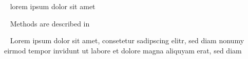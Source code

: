 



\vspace{-\baselineskip} %

\setcounter{figure}{0}
\setcounter{table}{0}






\ %
lorem ipsum dolor sit amet


\ %
Methods are described in 



\ %
Lorem ipsum dolor sit amet, consetetur sadipscing elitr, sed diam nonumy
eirmod tempor invidunt ut labore et dolore magna aliquyam erat, sed diam

